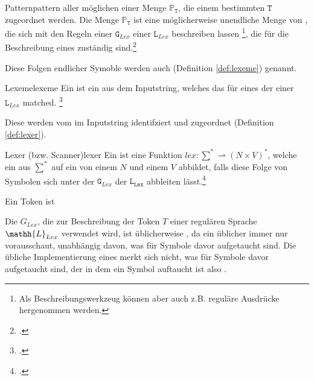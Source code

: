 \begin{Definition}{Pattern}{pattern}
   aller möglichen  einer Menge $\mathbb{P}_\mathtt{T}$, die einem bestimmten  $\mathtt{T}$ zugeordnet werden.
  Die Menge $\mathbb{P}_\mathtt{T}$ ist eine möglicherweise unendliche Menge von , die sich mit den Regeln einer  $\mathtt{G}_{Lex}$ einer  $\mathtt{L}_{Lex}$ beschreiben lassen \footnote{Als Beschreibungswerkzeug können aber auch z.B. reguläre Ausdrücke hergenommen werden.}, die für die Beschreibung eines  zuständig sind.\footcite{noauthor_what_nodate}
\end{Definition}

Diese Folgen endlicher Symoble werden auch  (Definition \ref{def:lexeme}) genannt.

\begin{Definition}{Lexeme}{lexeme}
  Ein  ist ein  aus dem Inputstring, welches das  für eines der  einer  $\mathtt{L}_{Lex}$ matched.
\footcite{noauthor_what_nodate}
\end{Definition}

Diese  werden vom  im Inputstring identifziert und  zugeordnet (Definition \ref{def:lexer}).

\begin{Definition}{Lexer (bzw. Scanner)}{lexer}
  Ein  ist eine  Funktion \hspace{0.2cm}$lex: \sum^{*} \rightharpoonup (N \times V)^{*}$, welche ein  aus $\sum^{*}$ auf ein  von einem  $N$ und einem   $V$ abbildet, falls diese Folge von Symbolen sich unter der  $\mathtt{G}_{Lex}$ der  $\mathtt{L_{Lex}}$ abbleiten lässt.\footcite{noauthor_lecture-notes-2021_2022}
\end{Definition}

Ein Token ist

\begin{special_paragraph}
  Die  $G_{Lex}$, die zur Beschreibung der Token $T$ einer regulären Sprache $\mathh{L}_{Lex}$ verwendet wird, ist üblicherweise , da ein üblicher  immer nur  vorausschaut, unabhängig davon, was für Symbole davor aufgetaucht sind. Die übliche Implementierung eines  merkt sich nicht, was für Symbole davor aufgetaucht sind, der  in dem ein Symbol auftaucht ist also .
\end{special_paragraph}

